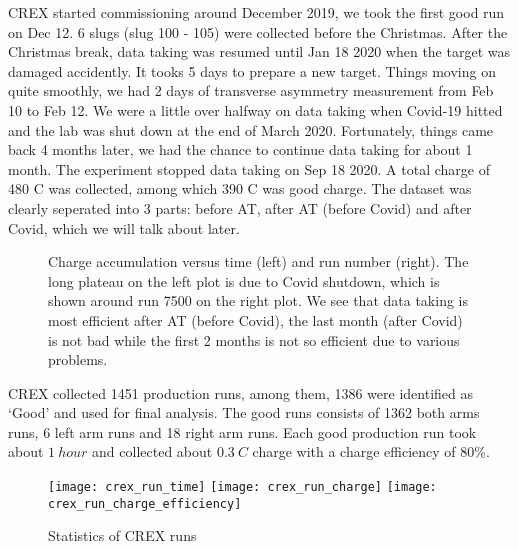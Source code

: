 CREX started commissioning around December 2019, we took the first good run on 
Dec 12. 6 slugs (slug 100 - 105) were collected before the Christmas. After 
the Christmas break, data taking was resumed until Jan 18 2020 when the \Ca 
target was damaged accidently. It tooks 5 days to prepare a new \Ca target.
Things moving on quite smoothly, we had 2 days of transverse asymmetry 
measurement from Feb 10 to Feb 12. We were a little over halfway on data taking 
when Covid-19 hitted and the lab was shut down at the end of March 2020. Fortunately,
things came back 4 months later, we had the chance to continue data taking for
about 1 month. The experiment stopped data taking on Sep 18 2020. A total charge
of 480 C was collected, among which 390 C was good charge. The dataset was clearly
seperated into 3 parts: before AT, after AT (before Covid) and after Covid, which
we will talk about later.
\begin{figure}[h!]
    \caption{Charge accumulation versus time (left) and run number (right). The
    long plateau on the left plot is due to Covid shutdown, which is shown around
    run 7500 on the right plot. We see that data taking is most efficient after
    AT (before Covid), the last month (after Covid) is not bad while the 
    first 2 months is not so efficient due to various problems.}
\end{figure}

CREX collected 1451 production runs, among them, 1386 were identified as `Good'
and used for final analysis. The good runs consists of 1362 both arms runs,
6 left arm runs and 18 right arm runs. Each good production run took about $1\ hour$
and collected about $0.3\ C$ charge with a charge efficiency of 80\%.
\begin{figure}[h!]
    \texttt{[image: crex\_run\_time]}
    \texttt{[image: crex\_run\_charge]}
    \texttt{[image: crex\_run\_charge\_efficiency]}
    \caption{Statistics of CREX runs}
\end{figure}

